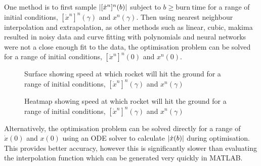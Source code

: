 One method is to first sample $\abs{[\dot{x}^n]^n(b)}$ subject to $b \geq \mathrm{burn\ time}$ for a range of initial conditions, $[\dot{x}^n]^n(\gamma)$ and $x^n(\gamma)$. Then using nearest neighbour interpolation and extrapolation, as other methods such as linear, cubic, makima resulted in noisy data and curve fitting with polynomials and neural networks were not a close enough fit to the data, the optimisation problem can be solved for a range of initial conditions, $[\dot{x}^n]^n(0)$ and $x^n(0)$.

\setlength{}
\setlength\fheight{0.4 \textheight}
\setlength{}
\setlength\wheight{0.3 \textheight}
%    

\begin{figure}[h]
    \centering
    
    \caption{Surface showing speed at which rocket will hit the ground for a range of initial conditions, $[\dot{x}^n]^n(\gamma)$ and $x^n(\gamma)$}
    \label{fig:1}
\end{figure}
\begin{figure}[h]
    \centering
    
    \caption{Heatmap showing speed at which rocket will hit the ground for a range of initial conditions, $[\dot{x}^n]^n(\gamma)$ and $x^n(\gamma)$}
    \label{fig:2}
\end{figure}
%        
%        
Alternatively, the optimisation problem can be solved directly for a range of $\dot{x}(0)$ and $x(0)$ using an ODE solver to calculate $\abs{\dot{x}(b)}$ during optimisation. 
This provides better accuracy, however this is significantly slower than evaluating the interpolation function which can be generated very quickly in MATLAB.


